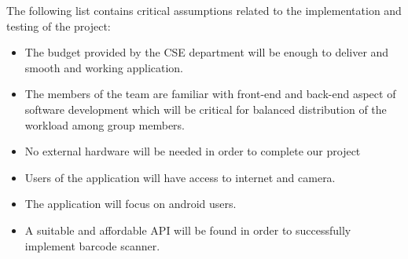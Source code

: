 The following list contains critical assumptions related to the implementation and testing of the project:

\begin{itemize}
  \item The budget provided by the CSE department will be enough to deliver and smooth and working application.
  \item The members of the team are familiar with front-end and back-end aspect of software development which 
  will be critical for balanced distribution of the workload among group members.
  \item No external hardware will be needed in order to complete our project
  \item Users of the application will have access to internet and camera.
  \item The application will focus on android users.
  \item A suitable and affordable API will be found in order to successfully implement barcode scanner.
\end{itemize}